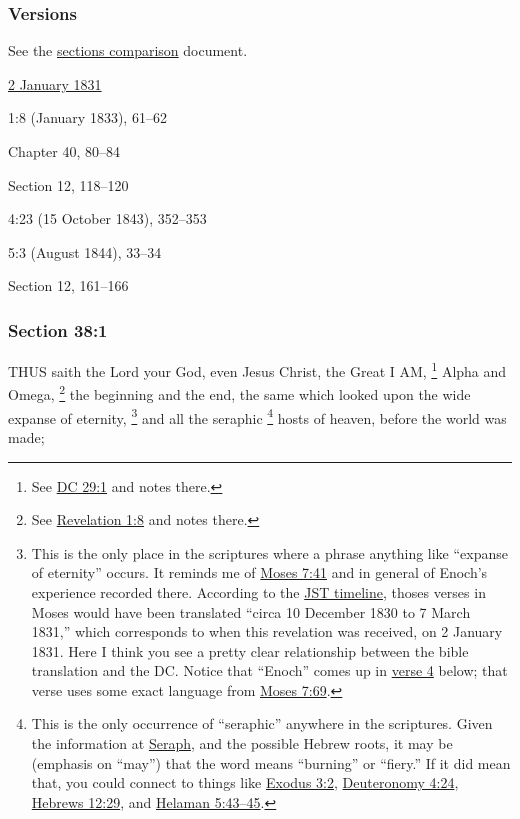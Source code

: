	\subsubsection{Versions}
		\label{DC38-V}
		
		See the \href{https://drive.google.com/file/d/1goAvNz8jS4R8slYfMG_db55Ty2z_vmgK/view?usp=sharing}{sections comparison} document.
	
		\begin{compactdesc}
			\item[JSP] \hyperref[EMS-1831-JS-2-JAN-1831]{2 January 1831}
			\item[EMS] 1:8 (January 1833), 61--62
			\item[BC] Chapter 40, 80--84
			\item[DC 1835] Section 12, 118--120
			\item[TS] 4:23 (15 October 1843), 352--353
			\item[MS] 5:3 (August 1844), 33--34
			\item[DC 1844] Section 12, 161--166
		\end{compactdesc}

	\subsubsection{Section 38:1} %
		\label{DC38-1}

		THUS saith the Lord your God, even Jesus Christ, the Great I AM,%
			\footnote{%
				See \hyperref[DC29-1]{DC 29:1} and notes there.
				}
		Alpha and Omega,%
			\footnote{%
				See \hyperref[REVELATIONNT-1-8]{Revelation 1:8} and notes there.
				}
		the beginning and the end, the same which looked upon the wide expanse of eternity,%
			\footnote{%
				This is the only place in the scriptures where a phrase anything like ``expanse of eternity'' occurs. It reminds me of \hyperref[MOSES-7-41]{Moses 7:41} and in general of Enoch's experience recorded there. According to the \hyperref[JST-TIMELINE]{JST timeline}, thoses verses in Moses would have been translated ``circa 10 December 1830 to 7 March 1831,'' which corresponds to when this revelation was received, on 2 January 1831. Here I think you see a pretty clear relationship between the bible translation and the DC. Notice that ``Enoch'' comes up in \hyperref[DC38-4]{verse 4} below; that verse uses some exact language from \hyperref[MOSES-7-69]{Moses 7:69}.
				}
		and all the seraphic%
			\footnote{%
				This is the only occurrence of ``seraphic'' anywhere in the scriptures. Given the information at \hyperref[SERAPH]{Seraph}, and the possible Hebrew roots, it may be (emphasis on ``may'') that the word means ``burning'' or ``fiery.'' If it did mean that, you could connect to things like \hyperref[EXODUS-3-2]{Exodus 3:2}, \hyperref[DEUTERONOMY-4-24]{Deuteronomy 4:24}, \hyperref[HEBREWS-12-29]{Hebrews 12:29}, and \hyperref[HELAMAN-5-43]{Helaman 5:43--45}.
				}
		hosts of heaven, before the world was made;

